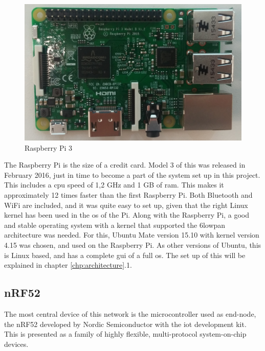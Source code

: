 \begin{figure}[ht]
    \centering
    \includegraphics[scale=0.35]{pi3.png}    
    \caption{Raspberry Pi 3}
    \label{fig:piPicture}
\end{figure}

\noindent The Raspberry Pi is the size of a credit card. Model 3 of this was released in February 2016, just in time to become a part of the system set up in this project. This includes a \gls{cpu} speed of 1,2 GHz and 1 GB of \gls{ram}. This makes it approximately 12 times faster than the first Raspberry Pi. Both Bluetooth and WiFi are included, and it was quite easy to set up, given that the right Linux kernel has been used in the \gls{os} of the Pi. Along with the Raspberry Pi, a good and stable operating system with a kernel that supported the \gls{6lowpan} architecture was needed. For this, Ubuntu Mate version 15.10 with kernel version 4.15 was chosen, and used on the Raspberry Pi. As other versions of Ubuntu, this is Linux based, and has a complete \gls{gui} of a full \gls{os}. The set up of this will be explained in chapter \ref{chp:architecture}.1. 

\subsection{nRF52}

\noindent The most central device of this network is the \gls{microcontroller} used as end-node, the nRF52 developed by Nordic Semiconductor with the \gls{iot} development kit. This is presented as a family of highly flexible, multi-protocol system-on-chip devices. 


